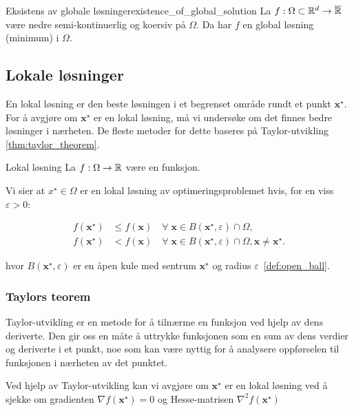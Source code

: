 \begin{theorem}{Eksistens av globale løsninger}{existence_of_global_solution}
	La \(f: \Omega \subset \mathbb{R}^d \to \overline{\mathbb{R}}\) være nedre semi-kontinuerlig og koersiv på \(\Omega\). Da har \(f\) en global løsning (minimum) i \(\Omega\).
\end{theorem}

\subsection{Lokale løsninger}
En lokal løsning er den beste løsningen i et begrenset område rundt et punkt \(\symbf{x}^\star\).
For å avgjøre om \(\symbf{x}^\star\) er en lokal løsning, må vi undersøke om det finnes bedre løsninger i nærheten. 
De fleste metoder for dette baseres på Taylor-utvikling \ref{thm:taylor_theorem}.


\begin{definition}{Lokal løsning}{}
	La \(f: \Omega \to \mathbb{R}\) være en funksjon.

	Vi sier at \(x^\star \in \Omega\) er en lokal løsning av optimeringsproblemet hvis, for en viss \(\varepsilon > 0\):

	\begin{align*}
		f(\symbf{x}^\star) & \leq f(\symbf{x}) \quad \forall \; \symbf{x} \in B(\symbf{x}^\star, \varepsilon) \cap \Omega,                                                  \\
		f(\symbf{x}^\star) & < f(\symbf{x}) \quad \forall \; \symbf{x} \in B(\symbf{x}^\star, \varepsilon) \cap \Omega, \symbf{x} \neq \symbf{x}^\star. \tag{Strengt lokal}
	\end{align*}

	hvor \(B(\symbf{x}^\star, \varepsilon)\) er en åpen kule med sentrum \(\symbf{x}^\star\) og radius \(\varepsilon\)~\ref{def:open_ball}.
\end{definition}

\subsubsection{Taylors teorem}
Taylor-utvikling er en metode for å tilnærme en funksjon ved hjelp av dens deriverte.
Den gir oss en måte å uttrykke funksjonen som en sum av dens verdier og deriverte i et punkt, noe som kan være nyttig for å analysere oppførselen til funksjonen i nærheten av det punktet.

Ved hjelp av Taylor-utvikling kan vi avgjøre om \(\symbf{x}^\star\) er en lokal løsning ved å sjekke om gradienten \(\nabla f(\symbf{x}^\star) = 0\) og Hesse-matrisen \(\nabla^2 f(\symbf{x}^\star)\)

